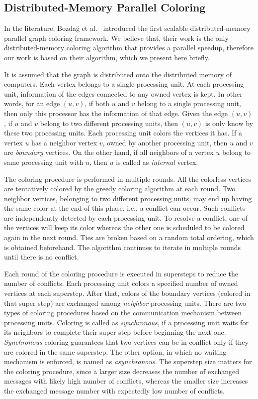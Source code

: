 \documentclass{article}
\begin{document}
\subsection{Distributed-Memory Parallel Coloring}
\label{sec:jpdc}

In the literature, Bozda\u{g} et al.~\cite{BGMBC-jpdc} introduced the first
scalable distributed-memory parallel graph coloring framework. We believe that, their
work is the only distributed-memory coloring algorithm that provides
a parallel speedup, therefore our work is based on their algorithm, which we
present here briefly.

It is assumed that the graph is distributed onto the distributed
memory of computers. Each vertex belongs to a single processing unit. 
At each processing unit, information of the edges connected to any owned vertex
is kept. In other words, for an edge $(u, v)$, if both $u$ and $v$ belong to
a single processing unit, then only this processor has the information of that edge.
Given the edge $(u, v)$, if $u$ and $v$ belong to two different
processing units, then $(u, v)$ is only know by these two processing units.
Each processing unit colors the vertices it has. If a vertex $u$ has a neighbor
vertex $v$, owned by another processing unit, then $u$ and $v$ are {\em
  boundary} vertices. On the other hand, if all neighbors of a vertex $u$
belong to same processing unit with $u$, then $u$ is called as {\em internal} vertex.

The coloring procedure is performed in multiple rounds. All the colorless vertices are
tentatively colored by the greedy coloring algorithm at each round.
Two neighbor vertices, belonging to two different processing units, may
end up having the same color at the end of this phase, i.e., a conflict can occur.
Such conflicts are independently detected by each processing unit. To resolve a conflict,
one of the vertices will keep its color whereas the other one is scheduled to be
colored again in the next round. Ties are broken based on a random total ordering,
which is obtained beforehand. The algorithm continues to iterate in multiple rounds until there is no conflict.

Each round of the coloring procedure is executed in supersteps to reduce the number of conflicts.
Each processing unit colors a specified number of owned vertices at
each superstep. After that, colors of the boundary vertices (colored in that super step)
are exchanged among {\em neighbor} processing units. There are two types of
coloring procedures based on the communication mechanism between processing units.
Coloring is called as {\em synchronous}, if a processing unit waits for its
neighbors to complete their super step before beginning the next one. {\em Synchronous}
coloring guarantees that two vertices can be in conflict only if they are colored
in the same superstep. The other option, in which no waiting mechanism is enforced, is named
as {\em asynchronous}. The superstep size matters for the coloring procedure, since a larger
size decreases the number of exchanged messages with likely high number of conflicts, whereas
the smaller size increases the exchanged message number with expectedly low number of conflicts.
\end{document}
